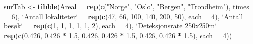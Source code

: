 \documentclass[]{article}
\newenvironment{Shaded}{\begin{snugshade}}{\end{snugshade}}
\newcommand{\KeywordTok}[1]{\textcolor[rgb]{0.13,0.29,0.53}{\textbf{#1}}}
\newcommand{\DataTypeTok}[1]{\textcolor[rgb]{0.13,0.29,0.53}{#1}}
\newcommand{\DecValTok}[1]{\textcolor[rgb]{0.00,0.00,0.81}{#1}}
\newcommand{\FloatTok}[1]{\textcolor[rgb]{0.00,0.00,0.81}{#1}}
\newcommand{\StringTok}[1]{\textcolor[rgb]{0.31,0.60,0.02}{#1}}
\newcommand{\OperatorTok}[1]{\textcolor[rgb]{0.81,0.36,0.00}{\textbf{#1}}}
\newcommand{\NormalTok}[1]{#1}
\begin{document}
\begin{Shaded}
\begin{Highlighting}[]
\NormalTok{surTab <-}\StringTok{ }\KeywordTok{tibble}\NormalTok{(}\DataTypeTok{Areal =} \KeywordTok{rep}\NormalTok{(}\KeywordTok{c}\NormalTok{(}\StringTok{"Norge"}\NormalTok{, }\StringTok{"Oslo"}\NormalTok{, }\StringTok{"Bergen"}\NormalTok{, }\StringTok{"Trondheim"}\NormalTok{), }\DataTypeTok{times =} \DecValTok{6}\NormalTok{), }
    \StringTok{`}\DataTypeTok{Antall lokaliteter}\StringTok{`}\NormalTok{ =}\StringTok{ }\KeywordTok{rep}\NormalTok{(}\KeywordTok{c}\NormalTok{(}\DecValTok{47}\NormalTok{, }\DecValTok{66}\NormalTok{, }\DecValTok{100}\NormalTok{, }\DecValTok{140}\NormalTok{, }\DecValTok{200}\NormalTok{, }\DecValTok{50}\NormalTok{), }\DataTypeTok{each =} \DecValTok{4}\NormalTok{), }\StringTok{`}\DataTypeTok{Antall besøk}\StringTok{`}\NormalTok{ =}\StringTok{ }\KeywordTok{rep}\NormalTok{(}\KeywordTok{c}\NormalTok{(}\DecValTok{1}\NormalTok{, }
        \DecValTok{1}\NormalTok{, }\DecValTok{1}\NormalTok{, }\DecValTok{1}\NormalTok{, }\DecValTok{1}\NormalTok{, }\DecValTok{2}\NormalTok{), }\DataTypeTok{each =} \DecValTok{4}\NormalTok{), }\StringTok{`}\DataTypeTok{Deteksjonsrate 250x250m}\StringTok{`}\NormalTok{ =}\StringTok{ }\KeywordTok{rep}\NormalTok{(}\KeywordTok{c}\NormalTok{(}\FloatTok{0.426}\NormalTok{, }
        \FloatTok{0.426} \OperatorTok{*}\StringTok{ }\FloatTok{1.5}\NormalTok{, }\FloatTok{0.426}\NormalTok{, }\FloatTok{0.426} \OperatorTok{*}\StringTok{ }\FloatTok{1.5}\NormalTok{, }\FloatTok{0.426}\NormalTok{, }\FloatTok{0.426} \OperatorTok{*}\StringTok{ }\FloatTok{1.5}\NormalTok{), }\DataTypeTok{each =} \DecValTok{4}\NormalTok{))}








\end{Highlighting}
\end{Shaded}
\end{document}
